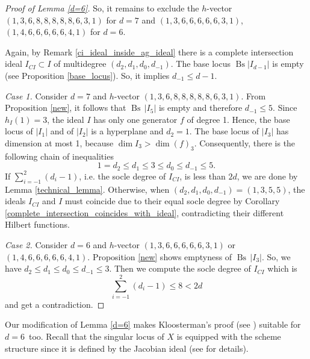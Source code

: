 \documentclass[a4paper,11pt,english,german]{amsart}
\DeclareMathOperator{\Bs}{Bs}
\theoremstyle{definition}
\begin{document}
\begin{proof}[Proof of Lemma \ref{d=6}]
So, it remains to exclude the $h$-vector $(1,3,6,8,8,8,8,8,6,3,1)$ for $d=7$ and $(1,3,6,6,6,6,6,3,1)$, $(1,4,6,6,6,6,6,4,1)$ for $d=6$. 
	
	
	Again, by Remark \ref{ci_ideal_inside_ag_ideal} there is a complete intersection ideal $I_{CI}\subset I$ of multidegree $(d_2,d_1,d_0,d_{-1})$. The base locus $\Bs|I_{d-1}|$ is empty (see Proposition \ref{base_locus}). So, it implies $d_{-1}\leqslant d-1$.
	
	\emph{Case 1.} Consider $d=7$ and $h$-vector $(1, 3, 6, 8, 8, 8, 8, 8, 6, 3, 1)$. From Proposition \ref{new}, it follows that $\Bs\,|I_5|$ is empty and therefore $d_{-1}\leqslant 5$. Since $h_I(1)=3$, the ideal $I$ has only one generator $f$ of degree 1. Hence, the base locus of $|I_1|$ and of $|I_2|$ is a hyperplane and $d_2=1$. The base locus of $|I_3|$ has dimension at most 1, because $\dim I_3>\dim (f)_3$. Consequently, there is the following chain of inequalities
	 $$1=d_2 \leqslant  d_1\leqslant 3 \leqslant d_0 \leqslant d_{-1} \leqslant 5.$$
	 If $\sum\limits_{i=-1}^2 (d_i -1)$, i.e. the socle degree of $I_{CI}$, is less than $2d$, we are done by Lemma \ref{technical_lemma}. Otherwise, when $(d_2,d_1,d_0,d_{-1})=(1,3,5,5)$, the ideals $I_{CI}$ and $I$ must coincide due to their equal socle degree by Corollary \ref{complete_intersection_coincides_with_ideal}, contradicting their different Hilbert functions.
	 
	 \emph{Case 2.} Consider $d=6$ and $h$-vector $(1,3,6,6,6,6,6,3,1)$ or $(1,4,6,6,6,6,6,4,1)$. Proposition \ref{new} shows emptyness of $\Bs\,|I_3|$. So, we have  $d_2 \leqslant d_1 \leqslant d_0 \leqslant d_{-1} \leqslant 3$. Then we compute the socle degree of $I_{CI}$ which is
	 $$\sum\limits_{i=-1}^{2}(d_i -1)\leqslant 8 <2d$$
	  and get a contradiction.
	 
\end{proof} 

Our modification of Lemma \ref{d=6} makes Kloosterman's proof (see \cite[Theorem 5.5]{kloosterman2022maximal}) suitable for~$d=6$~too. Recall that the singular locus of $X$ is equipped with the scheme structure since it is defined by the Jacobian ideal (see \cite[Definition V-21]{eisenbud2006geometry} for details).
\end{document}
